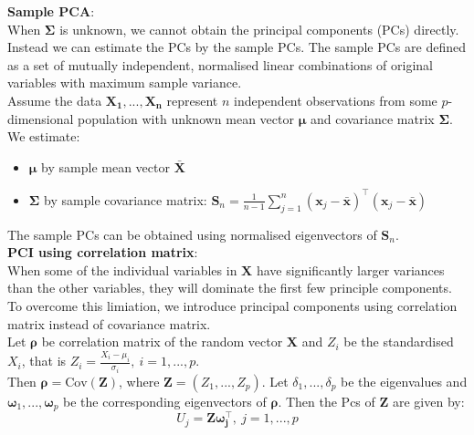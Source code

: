 \documentclass[11pt]{article}
\begin{document}
\noindent \textbf{Sample PCA}: \\
\noindent When $\boldsymbol{\Sigma}$ is unknown, we cannot obtain the principal components (PCs) directly. Instead we can estimate the PCs by the sample PCs. The sample PCs are defined as a set of mutually independent, normalised linear combinations of original variables with maximum sample variance. \\

\noindent Assume the data $\boldsymbol{X_1}, ..., \boldsymbol{X_n}$ represent $n$ independent observations from some $p$-dimensional population with unknown mean vector $\boldsymbol{\mu}$ and covariance matrix $\boldsymbol{\Sigma}$. We estimate:
\begin{itemize}
    \item $\boldsymbol{\mu}$ by sample mean vector $\boldsymbol{\bar{X}}$
    \item $\boldsymbol{\Sigma}$ by sample covariance matrix: $\boldsymbol{S}_n = \frac{1}{n-1}\sum_{j=1}^{n}{(\boldsymbol{x}_j - \bar{\boldsymbol{x}})^\top (\boldsymbol{x}_j - \bar{\boldsymbol{x}})}$
\end{itemize}
\noindent The sample PCs can be obtained using normalised eigenvectors of $\boldsymbol{S}_n$. \\

\noindent \textbf{PCI using correlation matrix}: \\
\noindent When some of the individual variables in $\boldsymbol{X}$ have significantly larger variances than the other variables, they will dominate the first few principle components. To overcome this limiation, we introduce principal components using correlation matrix instead of covariance matrix. \\

\noindent Let $\boldsymbol{\rho}$ be correlation matrix of the random vector $\boldsymbol{X}$ and $Z_i$ be the standardised $X_i$, that is $Z_i = \frac{X_i - \mu_i}{\sigma_i}, \ i=1,...,p$. \\

\noindent Then $\boldsymbol{\rho} = \text{Cov}(\boldsymbol{Z})$, where $\boldsymbol{Z} = (Z_1,...,Z_p)$. Let $\delta_1,...,\delta_p$ be the eigenvalues and $\boldsymbol{\omega}_1,...,\boldsymbol{\omega}_p$ be the corresponding eigenvectors of $\boldsymbol{\rho}$. Then the Pcs of $\boldsymbol{Z}$ are given by:
$$U_j = \boldsymbol{Z\omega_j^\top}, \: j=1,...,p$$
\end{document}
